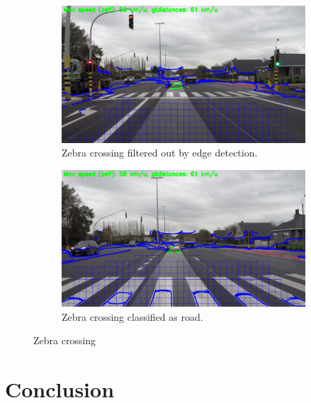 \documentclass[runningheads,a4paper]{llncs}
\begin{document}
\begin{figure}[t]
\centering
\begin{subfigure}[t]{.5\textwidth}
  \centering
  \includegraphics[width=.9\textwidth]{fig/zebra_edge_filtered.png}
  \caption{Zebra crossing filtered out by edge detection.}
  \label{zebra-1}
\end{subfigure}%
\begin{subfigure}[t]{.5\textwidth}
  \centering
  \includegraphics[width=.9\textwidth]{fig/zebra_road_filtered.png}
  \caption{Zebra crossing classified as road.}
  \label{zebra-2}
\end{subfigure}
\caption{Zebra crossing\label{zebra}}
\end{figure}

\section{Conclusion}
\newpage
{}

\end{document}
